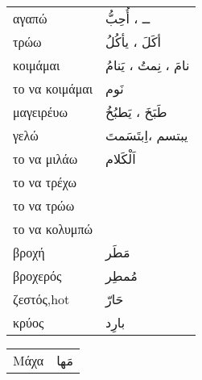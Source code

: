 \documentclass[twocolumn,a4paper]{article}
\newcommand{\ar}[1]{\textarabic{#1}}
\newcommand{\vrf}{\raisebox{0.15ex}{\footnotesize ◉}}
\newcommand{\vr}{\raisebox{0.15ex}{\footnotesize ◎}}
\newcommand{\mas}{\raisebox{0.15ex}{\footnotesize ◫}}
\begin{document}
\begin{mpsupertabular}{ P{0.5\textwidth} P{0.5\textwidth} }
αγαπώ \vr            & \ar{ ــ ، أُحِبُّ } \\  %
τρώω  \vrf           & \ar{ أكَلَ ، يأكُلُ }  \\
κοιμάμαι \vrf   & \ar{ نامَ ، نِمتُ ، يَنامُ }  \\
το να κοιμάμαι \mas      & \ar{ نَوم } \\
μαγειρέυω \vrf       & \ar{ طَبَخَ ، يَطبُخُ } \\
γελώ \vrf            & \ar{ يبتسم ،اِبتَسَمتَ }  \\
το να μιλάω \mas      & \ar{ اَلْكَلام } \\
το να τρέχω \mas      & \ar{  } \\
το να τρώω \mas      & \ar{  } \\
το να κολυμπώ \mas      & \ar{  } \\
βροχή                & \ar{ مَطَر } \\
βροχερός             & \ar{ مُمطِر } \\
ζεστός,hot           & \ar{ حَارّ } \\
κρύος                & \ar{ بارِد } \\


\end{mpsupertabular}
\clearpage

\begin{mpsupertabular}{ P{0.5\textwidth} P{0.5\textwidth} }
Μάχα               & \ar{ مَها } \\
\end{mpsupertabular}

\clearpage
\end{document}
